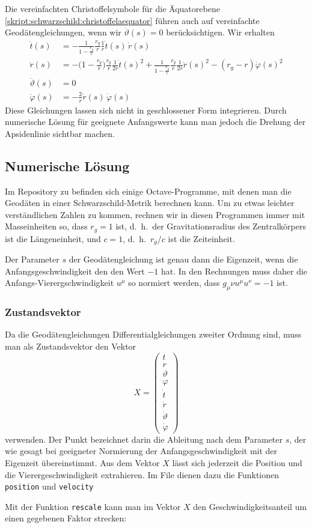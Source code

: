 Die vereinfachten Christoffelsymbole für die Äquatorebene
\eqref{skript:schwarzschild:christoffelaequator}
führen auch auf vereinfachte Geodätengleichungen, wenn wir $\dot\vartheta(s)=0$
berücksichtigen.
Wir erhalten
\begin{align*}
\ddot t(s)
&=
-\frac{1}{1-\displaystyle\frac{r_g}{r}}\frac{r_g}{r}\frac{1}{r}\dot t(s)\,\dot r(s)
\\
\ddot r(s)
&=
-\biggl(1-\frac{r_g}{r}\biggr)\frac{r_g}{r}\frac1{2r}\dot t(s)^2
+\frac{1}{1-\displaystyle\frac{r_g}{r}} \frac{r_g}{r}\frac1{2r}\dot r(s)^2
- (r_g-r) \dot\varphi(s)^2
\\
\ddot \vartheta(s)
&=
0
\\
\ddot \varphi(s)
&=
-\frac2r \dot r(s)\,\dot\varphi(s)
\end{align*}
Diese Gleichungen lassen sich nicht in geschlossener Form integrieren.
Durch numerische Lösung für geeignete Anfangswerte kann man jedoch die
Drehung der Apsidenlinie sichtbar machen.

\subsection{Numerische Lösung}
Im Repository zu befinden sich einige Octave-Programme, mit denen man
die Geodäten in einer Schwarzschild-Metrik berechnen kann.
Um zu etwas leichter verständlichen Zahlen zu kommen, rechnen wir
in diesen Programmen immer mit Masseinheiten so, dass $r_g=1$ ist,
d.~h.~der Gravitationsradius des Zentralkörpers ist die Längeneinheit,
und $c=1$, d.~h.~$r_g/c$ ist die Zeiteinheit.

Der Parameter $s$ der Geodätengleichung ist genau dann die Eigenzeit,
wenn die Anfangsgeschwindigkeit den den Wert $-1$ hat.
In den Rechnungen muss daher die Anfangs-Vierergschwindigkeit $u^\mu$
so normiert werden, dass $g_\mu\nu u^\mu u^\nu=-1$ ist.

\subsubsection{Zustandsvektor}
Da die Geodätengleichungen Differentialgleichungen zweiter Ordnung sind,
muss man als Zustandsvektor den Vektor
\[
X=\begin{pmatrix}
t\\r\\\vartheta\\\varphi \\\dot t\\\dot r\\\dot \vartheta\\\dot\varphi
\end{pmatrix}
\]
verwenden.
Der Punkt bezeichnet darin die Ableitung nach dem Parameter $s$, der
wie gesagt bei geeigneter Normierung der Anfangsgeschwindigkeit mit
der Eigenzeit übereinstimmt.
Aus dem Vektor $X$ lässt sich jederzeit die Position und die
Vierergeschwindigkeit extrahieren.
Im File  dienen dazu die Funktionen
\texttt{position} und \texttt{velocity}

Mit der Funktion \texttt{rescale} kann man im Vektor $X$ den
Geschwindigkeitsanteil um einen gegebenen Faktor strecken:


